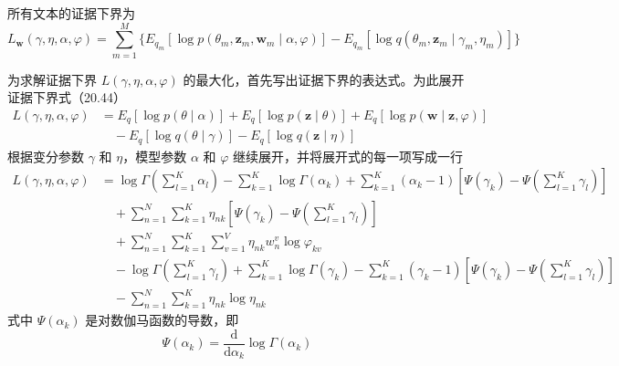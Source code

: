\documentclass[UTF8, 12pt, fontset=fandol, oneside]{ctexart}
\begin{document}
所有文本的证据下界为
\begin{equation}
L_{\mathbf{w}}(\gamma,\eta,\alpha,\varphi)=\sum_{m=1}^M \{E_{q_m}[\log p(\theta_m,\mathbf{z}_m,\mathbf{w}_m\mid\alpha,\varphi)]-E_{q_m}[\log q(\theta_m,\mathbf{z}_m\mid\gamma_m,\eta_m)]\}
\tag{20.45}
\end{equation}

为求解证据下界 $L(\gamma,\eta,\alpha,\varphi)$ 的最大化，首先写出证据下界的表达式。为此展开证据下界式（20.44）
\begin{equation}
\begin{aligned}
L(\gamma,\eta,\alpha,\varphi)
&=E_q[\log p(\theta\mid\alpha)]+E_q[\log p(\mathbf{z}\mid\theta)]+E_q[\log p(\mathbf{w}\mid\mathbf{z},\varphi)]\\
&\quad -E_q[\log q(\theta\mid\gamma)]-E_q[\log q(\mathbf{z}\mid\eta)]
\end{aligned}
\tag{20.46}
\end{equation}
根据变分参数 $\gamma$ 和 $\eta$，模型参数 $\alpha$ 和 $\varphi$ 继续展开，并将展开式的每一项写成一行
\begin{equation}
\begin{aligned}
L(\gamma,\eta,\alpha,\varphi)
&=\log\Gamma\left(\sum_{l=1}^K\alpha_l\right)-\sum_{k=1}^K\log\Gamma(\alpha_k)
+\sum_{k=1}^K(\alpha_k-1)\left[\Psi(\gamma_k)-\Psi\left(\sum_{l=1}^K\gamma_l\right)\right]\\
&\quad +\sum_{n=1}^N\sum_{k=1}^K\eta_{nk}\left[\Psi(\gamma_k)-\Psi\left(\sum_{l=1}^K\gamma_l\right)\right]\\
&\quad +\sum_{n=1}^N\sum_{k=1}^K\sum_{v=1}^V \eta_{nk}w_n^v\log\varphi_{kv}\\
&\quad -\log\Gamma\left(\sum_{l=1}^K\gamma_l\right)+\sum_{k=1}^K\log\Gamma(\gamma_k)
-\sum_{k=1}^K(\gamma_k-1)\left[\Psi(\gamma_k)-\Psi\left(\sum_{l=1}^K\gamma_l\right)\right]\\
&\quad -\sum_{n=1}^N\sum_{k=1}^K\eta_{nk}\log\eta_{nk}
\end{aligned}
\tag{20.47}
\end{equation}
式中 $\Psi(\alpha_k)$ 是对数伽马函数的导数，即
\begin{equation}
\Psi(\alpha_k)=\frac{\mathrm{d}}{\mathrm{d}\alpha_k}\log\Gamma(\alpha_k)
\tag{20.48}
\end{equation}
\end{document}
